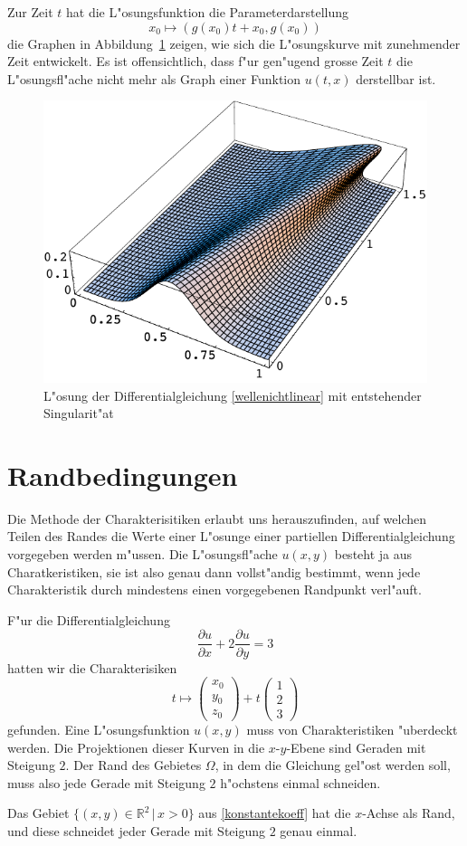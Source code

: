 Zur Zeit $t$ hat die L"osungsfunktion die Parameterdarstellung
$$
x_0\mapsto (g(x_0)t+x_0,g(x_0))
$$
die Graphen in Abbildung~\ref{g} zeigen, wie sich die L"osungskurve
mit zunehmender Zeit entwickelt.
Es ist offensichtlich, dass f"ur gen"ugend grosse Zeit $t$ die
L"osungsfl"ache nicht mehr als Graph einer Funktion $u(t,x)$ derstellbar ist.
\begin{figure}
\begin{center}
\includegraphics[width=\hsize]{graphics/welle}
\end{center}
\caption{L"osung der Differentialgleichung \ref{wellenichtlinear} mit
entstehender Singularit"at\label{g}}
\end{figure}

\section{Randbedingungen}
Die Methode der Charakterisitiken erlaubt uns herauszufinden, auf welchen
Teilen des Randes die Werte einer L"osunge einer partiellen
Differentialgleichung vorgegeben werden m"ussen.
Die L"osungsfl"ache $u(x,y)$ besteht ja aus Charatkeristiken, sie ist also
genau dann vollst"andig bestimmt, wenn jede Charakteristik durch mindestens 
einen vorgegebenen Randpunkt verl"auft.

F"ur die Differentialgleichung
\[
\frac{\partial u}{\partial x}+2\frac{\partial u}{\partial y}=3
\]
hatten wir die Charakterisiken 
\[
t\mapsto\begin{pmatrix}x_0\\y_0\\z_0\end{pmatrix}+t\begin{pmatrix}1\\2\\3\end{pmatrix}
\]
gefunden. Eine L"osungsfunktion $u(x,y)$ muss von Charakteristiken
"uberdeckt werden. 
Die Projektionen dieser Kurven in die $x$-$y$-Ebene sind Geraden
mit Steigung $2$. Der Rand des Gebietes $\Omega$, in dem die Gleichung gel"ost
werden soll, muss also jede Gerade mit Steigung $2$ h"ochstens einmal
schneiden.

Das Gebiet $\{(x,y)\in\mathbb R^2\,|\, x >0\}$  aus \ref{konstantekoeff}
hat die $x$-Achse als Rand, und diese schneidet jeder Gerade mit Steigung
$2$ genau einmal.
